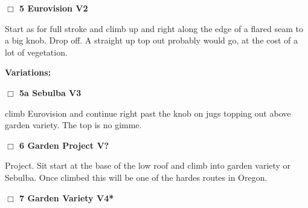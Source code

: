 \begin{multicols}{2}
\needspace{2em}
\label{rt:Eurovision}
\colorbox{green!20}{
\parbox{0.95\linewidth}{
\hspace{-1ex}\textbf{$\Box$
5 Eurovision V2  
}}}
\begin{adjustwidth}{1.3em}{}			

Start as for full stroke and climb up and right along the edge of a flared seam to a big knob. Drop off. A straight up top out probably would go, at the cost of a lot of vegetation.
\end{adjustwidth}


\begin{adjustwidth}{0.5cm}{}				
\needspace{4em}
\textbf{Variations:} \newline

\needspace{2em}
\label{vr:Sebulba}
\colorbox{green!20}{
\parbox{0.95\linewidth}{
\hspace{-1ex}\textbf{$\Box$
5a Sebulba V3  \warn
}}}
\begin{adjustwidth}{1.3em}{}			

climb Eurovision and continue right past the knob on jugs topping out above garden variety. The top is no gimme.
\end{adjustwidth}



\end{adjustwidth}


\needspace{2em}
\label{rt:Garden Project}
\colorbox{black!20}{
\parbox{0.95\linewidth}{
\hspace{-1ex}\textbf{$\Box$
6 Garden Project V?  
}}}
\begin{adjustwidth}{1.3em}{}			

Project. Sit start at the base of the low roof and climb into garden variety or Sebulba. Once climbed this will be one of the hardes routes in Oregon.
\end{adjustwidth}



\label{tp:arboretum2}
  \begin{landscape}
	
  \end{landscape}


\needspace{2em}
\label{rt:Garden Variety}
\colorbox{RoyalBlue!20}{
\parbox{0.95\linewidth}{
\hspace{-1ex}\textbf{$\Box$
7 Garden Variety V4*  
}}}
\begin{adjustwidth}{1.3em}{}			


\end{adjustwidth}
\end{multicols}
